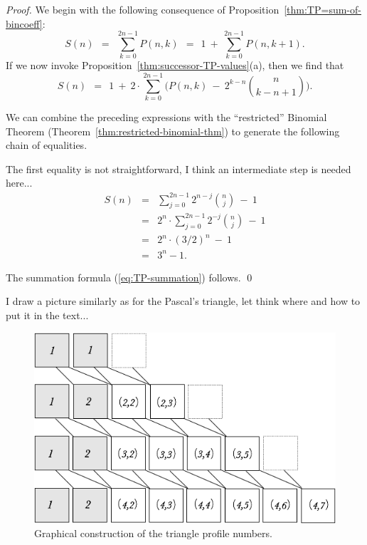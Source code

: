 \begin{proof}
We begin with the following consequence of
Proposition~\ref{thm:TP=sum-of-bincoeff}:
\[
S(n) \ \ = \ \
  \sum_{k=0}^{2n-1} P(n,k)
     \ \ = \ \
  1 \ + \ \sum_{k=0}^{2n-1} P(n,k+1).
\]
If we now invoke Proposition~\ref{thm:successor-TP-values}(a), then we
find that
\[
S(n) \ \ = \ \ 1 \ + \ 2 \cdot \sum_{k=0}^{2n-1} 
  \big( P(n,k) \ - \ 2^{k-n} {n \choose {k-n+1}} \big).
\]

We can combine the preceding expressions with the ``restricted''
Binomial Theorem (Theorem~\ref{thm:restricted-binomial-thm}) to
generate the following chain of equalities.

{\Denis The first equality is not straightforward, I think an intermediate step is needed here...}
\begin{eqnarray*}
S(n) & = & 
\sum_{j=0}^{2n-1} 2^{n-j} {n \choose j} \ - \ 1  \\
     & = &
2^n \cdot \sum_{j=0}^{2n-1} 2^{-j} {n \choose j} \ - \ 1 \\
     & = & 
2^n \cdot (3/2)^n \ - \ 1 \\
     & = &
3^n -1.
\end{eqnarray*}

The summation formula (\ref{eq:TP-summation}) follows.
\qed
\end{proof}

{\Denis I draw a picture similarly as for the Pascal's triangle, let think where and how to put it in the text...}
\begin{figure}
\begin{center}
        \includegraphics[scale=0.4]{FiguresMaths/TreeProfile}
        \caption{Graphical construction of the triangle profile numbers.}
        \label{Fig:treeprofile}
\end{center}
\end{figure}



